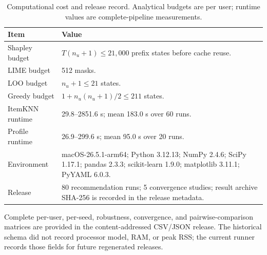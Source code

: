\begin{table}[ht]
\centering\scriptsize
\caption{Computational cost and release record. Analytical budgets are per user; runtime values are complete-pipeline measurements.}
\label{tab:app-computation}
\begin{tabular}{@{}p{}p{}@{}}
\toprule
Item & Value \\
\midrule
Shapley budget & $T(n_u+1)\le21{,}000$ prefix states before cache reuse. \\
LIME budget & 512 masks. \\
LOO budget & $n_u+1\le21$ states. \\
Greedy budget & $1+n_u(n_u+1)/2\le211$ states. \\
ItemKNN runtime & 29.8--2851.6 s; mean 183.0 s over 60 runs. \\
Profile runtime & 26.9--299.6 s; mean 95.0 s over 20 runs. \\
Environment & macOS-26.5.1-arm64; Python 3.12.13; NumPy 2.4.6; SciPy 1.17.1; pandas 2.3.3; scikit-learn 1.9.0; matplotlib 3.11.1; PyYAML 6.0.3. \\
Release & 80 recommendation runs; 5 convergence studies; result archive SHA-256 is recorded in the release metadata. \\
\bottomrule
\end{tabular}
\end{table}

\noindent Complete per-user, per-seed, robustness, convergence, and pairwise-comparison matrices are provided in the content-addressed CSV/JSON release. The historical schema did not record processor model, RAM, or peak RSS; the current runner records those fields for future regenerated releases.
